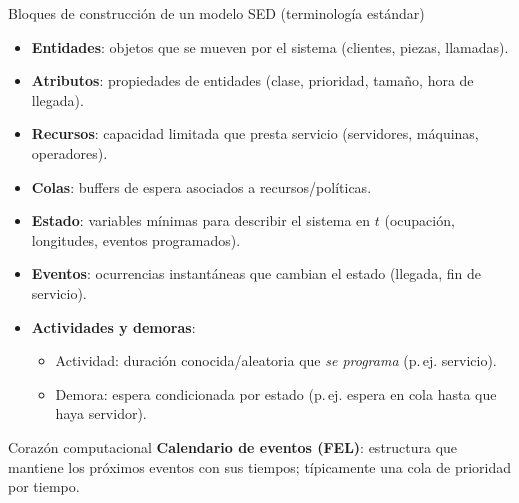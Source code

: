 \documentclass[aspectratio=1610, 9pt]{beamer}
\begin{document}
\begin{frame}{Bloques de construcción de un modelo SED}
\small
(terminología estándar)
\begin{itemize}
\item \textbf{Entidades}: objetos que se mueven por el sistema (clientes, piezas, llamadas).
\item \textbf{Atributos}: propiedades de entidades (clase, prioridad, tamaño, hora de llegada).
\item \textbf{Recursos}: capacidad limitada que presta servicio (servidores, máquinas, operadores).
\item \textbf{Colas}: buffers de espera asociados a recursos/políticas.
\item \textbf{Estado}: variables mínimas para describir el sistema en $t$ (ocupación, longitudes, eventos programados).
\item \textbf{Eventos}: ocurrencias instantáneas que cambian el estado (llegada, fin de servicio).
\item \textbf{Actividades y demoras}:
  \begin{itemize}
  \item Actividad: duración conocida/aleatoria que \emph{se programa} (p.\,ej. servicio).
  \item Demora: espera condicionada por estado (p.\,ej. espera en cola hasta que haya servidor).
  \end{itemize}
\end{itemize}

\vspace{4pt}
\begin{block}{Corazón computacional}
\textbf{Calendario de eventos (FEL)}: estructura que mantiene los próximos eventos con sus tiempos; típicamente una cola de prioridad por tiempo.
\end{block}
\end{frame}
\end{document}
